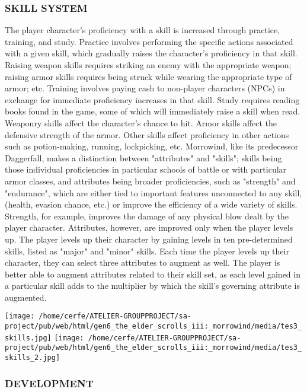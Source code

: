 \documentclass[a4paper,10pt]{book}
\begin{document}
 \subsubsection{ SKILL SYSTEM }
 
          The player character's proficiency with a skill is increased through practice, training, and study. Practice involves performing the specific actions associated with a given skill, which gradually raises the character's proficiency in that skill. Raising weapon skills requires striking an enemy with the appropriate weapon; raising armor skills requires being struck while wearing the appropriate type of armor; etc. Training involves paying cash to non-player characters (NPCs) in exchange for immediate proficiency increases in that skill. Study requires reading books found in the game, some of which will immediately raise a skill when read. Weaponry skills affect the character's chance to hit. Armor skills affect the defensive strength of the armor. Other skills affect proficiency in other actions such as potion-making, running, lockpicking, etc.
          Morrowind, like its predecessor Daggerfall, makes a distinction between "attributes" and "skills"; skills being those individual proficiencies in particular schools of battle or with particular armor classes, and attributes being broader proficiencies, such as "strength" and "endurance", which are either tied to important features unconnected to any skill, (health, evasion chance, etc.) or improve the efficiency of a wide variety of skills. Strength, for example, improves the damage of any physical blow dealt by the player character. Attributes, however, are improved only when the player levels up.
          The player levels up their character by gaining levels in ten pre-determined skills, listed as "major" and "minor" skills. Each time the player levels up their character, they can select three attributes to augment as well. The player is better able to augment attributes related to their skill set, as each level gained in a particular skill adds to the multiplier by which the skill's governing attribute is augmented.
         
 \texttt{[image: /home/cerfe/ATELIER-GROUPPROJECT/sa-project/pub/web/html/gen6\_the\_elder\_scrolls\_iii:\_morrowind/media/tes3\_skills.jpg]}
 \texttt{[image: /home/cerfe/ATELIER-GROUPPROJECT/sa-project/pub/web/html/gen6\_the\_elder\_scrolls\_iii:\_morrowind/media/tes3\_skills\_2.jpg]}
 
 \subsubsection{DEVELOPMENT }
 
\end{document}
